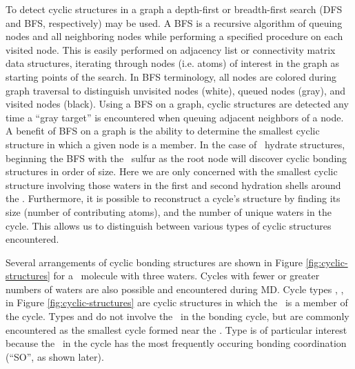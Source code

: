 To detect cyclic structures in a graph a depth-first or breadth-first search (DFS and BFS, respectively) may be used.\cite{Knuth1997, Cormen 2001} A BFS is a recursive algorithm of queuing nodes and all neighboring nodes while performing a specified procedure on each visited node. This is easily performed on adjacency list or connectivity matrix data structures, iterating through nodes (i.e. atoms) of interest in the graph as starting points of the search. In BFS terminology, all nodes are colored during graph traversal to distinguish unvisited nodes (white), queued nodes (gray), and visited nodes (black). Using a BFS on a graph, cyclic structures are detected any time a ``gray target'' is encountered when queuing adjacent neighbors of a node. A benefit of BFS on a graph is the ability to determine the smallest cyclic structure in which a given node is a member. In the case of \suldiox~hydrate structures, beginning the BFS with the \suldiox~sulfur as the root node will discover cyclic bonding structures in order of size. Here we are only concerned with the smallest cyclic structure involving those waters in the first and second hydration shells around the \suldiox. Furthermore, it is possible to reconstruct a cycle's structure by finding its size (number of contributing atoms), and the number of unique waters in the cycle. This allows us to distinguish between various types of cyclic structures encountered.

Several arrangements of cyclic bonding structures are shown in Figure \ref{fig:cyclic-structures} for a \suldiox~molecule with three waters. Cycles with fewer or greater numbers of waters are also possible and encountered during MD. Cycle types , ,  in Figure \ref{fig:cyclic-structures} are cyclic structures in which the \suldiox~is a member of the cycle. Types  and  do not involve the \suldiox~in the bonding cycle, but are commonly encountered as the smallest cycle formed near the \suldiox. Type  is of particular interest because the \suldiox~in the cycle has the most frequently occuring bonding coordination (``SO'', as shown later).

